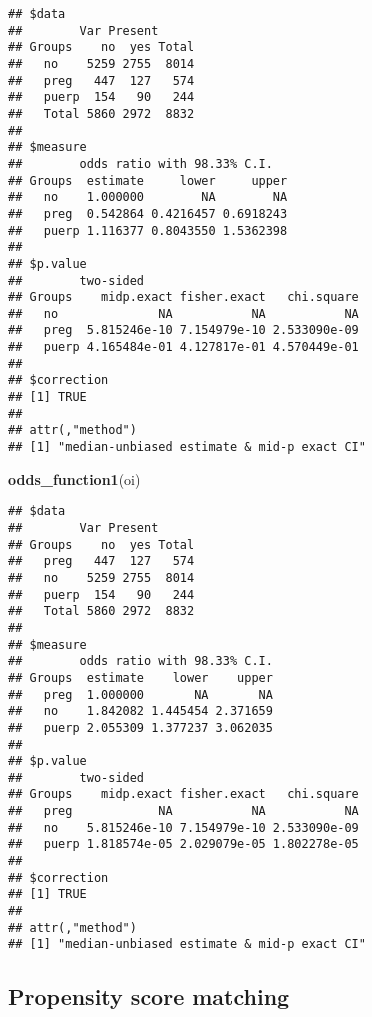 \documentclass[
]{article}
\newenvironment{Shaded}{\begin{snugshade}}{\end{snugshade}}
\newcommand{\KeywordTok}[1]{\textcolor[rgb]{0.13,0.29,0.53}{\textbf{#1}}}
\newcommand{\NormalTok}[1]{#1}
\newcommand{\OperatorTok}[1]{\textcolor[rgb]{0.81,0.36,0.00}{\textbf{#1}}}
\newcommand{\StringTok}[1]{\textcolor[rgb]{0.31,0.60,0.02}{#1}}
\begin{document}
\begin{Shaded}
\end{Shaded}

\begin{verbatim}
## $data
##        Var Present
## Groups    no  yes Total
##   no    5259 2755  8014
##   preg   447  127   574
##   puerp  154   90   244
##   Total 5860 2972  8832
## 
## $measure
##        odds ratio with 98.33% C.I.
## Groups  estimate     lower     upper
##   no    1.000000        NA        NA
##   preg  0.542864 0.4216457 0.6918243
##   puerp 1.116377 0.8043550 1.5362398
## 
## $p.value
##        two-sided
## Groups    midp.exact fisher.exact   chi.square
##   no              NA           NA           NA
##   preg  5.815246e-10 7.154979e-10 2.533090e-09
##   puerp 4.165484e-01 4.127817e-01 4.570449e-01
## 
## $correction
## [1] TRUE
## 
## attr(,"method")
## [1] "median-unbiased estimate & mid-p exact CI"
\end{verbatim}

\begin{Shaded}
\begin{Highlighting}[]
\KeywordTok{odds_function1}\NormalTok{(oi)}
\end{Highlighting}
\end{Shaded}

\begin{verbatim}
## $data
##        Var Present
## Groups    no  yes Total
##   preg   447  127   574
##   no    5259 2755  8014
##   puerp  154   90   244
##   Total 5860 2972  8832
## 
## $measure
##        odds ratio with 98.33% C.I.
## Groups  estimate    lower    upper
##   preg  1.000000       NA       NA
##   no    1.842082 1.445454 2.371659
##   puerp 2.055309 1.377237 3.062035
## 
## $p.value
##        two-sided
## Groups    midp.exact fisher.exact   chi.square
##   preg            NA           NA           NA
##   no    5.815246e-10 7.154979e-10 2.533090e-09
##   puerp 1.818574e-05 2.029079e-05 1.802278e-05
## 
## $correction
## [1] TRUE
## 
## attr(,"method")
## [1] "median-unbiased estimate & mid-p exact CI"
\end{verbatim}

\hypertarget{propensity-score-matching-2}{%
\subsection{Propensity score
matching}\label{propensity-score-matching-2}}
\end{document}
